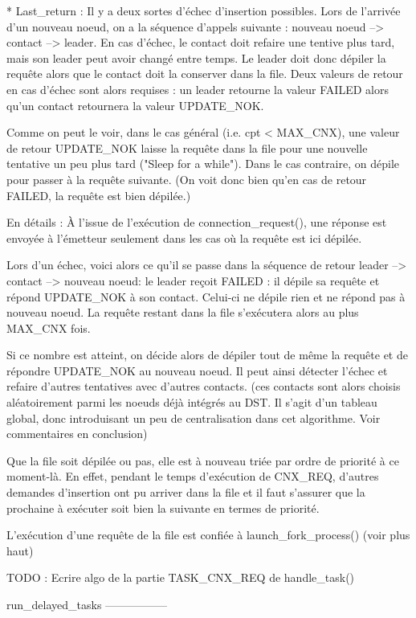 * Last_return :
Il y a deux sortes d'échec d'insertion possibles.
Lors de l'arrivée d'un nouveau noeud, on a la séquence d'appels suivante : nouveau noeud -->
contact --> leader. En cas d'échec, le contact doit refaire une tentive plus tard, mais son leader
peut avoir changé entre temps. Le leader doit donc dépiler la requête alors que le contact doit la
conserver dans la file. Deux valeurs de retour en cas d'échec sont alors requises : un leader
retourne la valeur FAILED alors qu'un contact retournera la valeur UPDATE_NOK.

Comme on peut le voir, dans le cas général (i.e. cpt < MAX_CNX), une valeur de retour UPDATE_NOK
laisse la requête dans la file pour une nouvelle tentative un peu plus tard ("Sleep for a while").
Dans le cas contraire, on dépile pour passer à la requête suivante. (On voit donc bien qu'en cas de
retour FAILED, la requête est bien dépilée.)

En détails :
À l'issue de l'exécution de connection_request(), une réponse est envoyée à l'émetteur seulement
dans les cas où la requête est ici dépilée.

Lors d'un échec, voici alors ce qu'il se passe dans la séquence de retour leader --> contact -->
nouveau noeud: le leader reçoit FAILED : il dépile sa requête et répond UPDATE_NOK à son contact.
Celui-ci ne dépile rien et ne répond pas à nouveau noeud. La requête restant dans la file s'exécutera
alors au plus MAX_CNX fois.

Si ce nombre est atteint, on décide alors de dépiler tout de même la requête et de répondre
UPDATE_NOK au nouveau noeud. Il peut ainsi détecter l'échec et refaire d'autres tentatives avec
d'autres contacts. (ces contacts sont alors choisis aléatoirement parmi les noeuds déjà intégrés au
DST. Il s'agit d'un tableau global, donc introduisant un peu de centralisation dans cet algorithme.
Voir commentaires en conclusion)

Que la file soit dépilée ou pas, elle est à nouveau triée par ordre de priorité à ce moment-là. En
effet, pendant le temps d'exécution de CNX_REQ, d'autres demandes d'insertion ont pu arriver dans la
file et il faut s'assurer que la prochaine à exécuter soit bien la suivante en termes de priorité.

L'exécution d'une requête de la file est confiée à launch_fork_process() (voir plus haut)

TODO : Ecrire algo de la partie TASK_CNX_REQ de handle_task()


run_delayed_tasks
-----------------

